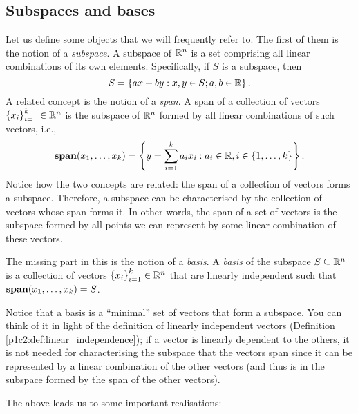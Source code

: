 \subsection{Subspaces and bases}

Let us define some objects that we will frequently refer to. The first of them is the notion of a \emph{subspace}. A subspace of $\mathbb{R}^n$ is a set comprising all linear combinations of its own elements. Specifically, if $S$ is a subspace, then
%
\begin{equation*}
	S = \left\{ ax + by : x,y \in S; a,b \in \mathbb{R} \right \}.
\end{equation*}
%
A related concept is the notion of a \emph{span}. A span of a collection of vectors $\left\{ x_i \right \}_{i=1}^k \in \mathbb{R}^n$ is the subspace of $\mathbb{R}^n$ formed by all linear combinations of such vectors, i.e., 
%
\begin{equation*}
	\mathop{\bf span}(x_1,\dots, x_k) = \left\{ y = \sum_{i=1}^k a_ix_i : a_i \in \mathbb{R}, i \in \left\{ 1,\dots, k \right \} \right \}. 
\end{equation*}
%
Notice how the two concepts are related: the span of a collection of vectors forms a subspace. Therefore, a subspace can be characterised by the collection of vectors whose span forms it. In other words, the span of a set of vectors is the subspace formed by all points we can represent by some linear combination of these vectors. 

The missing part in this is the notion of a \emph{basis}. A \emph{basis} of the subspace $S \subseteq \mathbb{R}^n$ is a collection of vectors $\left\{ x_i \right \}_{i=1}^k \in \mathbb{R}^n$ that are linearly independent such that $\mathop{\bf span}(x_1,\dots, x_k) = S$. 

Notice that a basis is a ``minimal'' set of vectors that form a subspace. You can think of it in light of the definition of linearly independent vectors (Definition \ref{p1c2:def:linear_independence}); if a vector is linearly dependent to the others, it is not needed for characterising the subspace that the vectors span since it can be represented by a linear combination of the other vectors (and thus is in the subspace formed by the span of the other vectors).

The above leads us to some important realisations:

